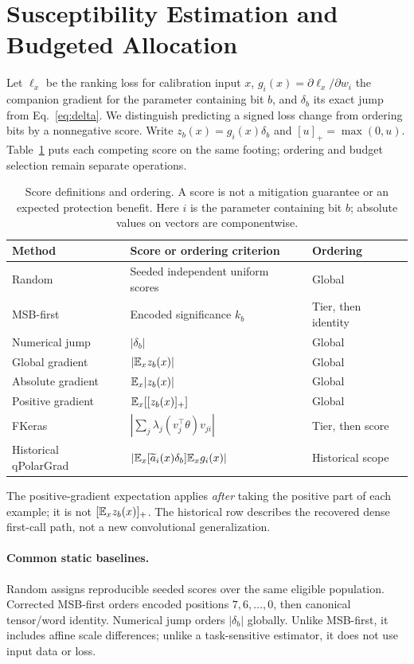 \section{Susceptibility Estimation and Budgeted Allocation}
\label{sec:estimators}
Let $\ell_x$ be the ranking loss for calibration input $x$, $g_i(x)=\partial\ell_x/\partial w_i$ the companion gradient for the parameter containing bit $b$, and $\delta_b$ its exact jump from Eq.~\eqref{eq:delta}. We distinguish predicting a signed loss change from ordering bits by a nonnegative score.
Write $z_b(x)=g_i(x)\delta_b$ and $[u]_+=\max(0,u)$.
Table~\ref{tab:definitions} puts each competing score on the same footing;
ordering and budget selection remain separate operations.
\begin{table}[t]\centering\small
\caption{Score definitions and ordering. A score is not a mitigation guarantee or an expected protection benefit. Here $i$ is the parameter containing bit $b$; absolute values on vectors are componentwise.}
\label{tab:definitions}
\begin{tabular}{lll}\toprule
Method & Score or ordering criterion & Ordering\\\midrule
Random & Seeded independent uniform scores & Global\\
MSB-first & Encoded significance $k_b$ & Tier, then identity\\
Numerical jump & $|\delta_b|$ & Global\\
Global gradient & $|\mathbb{E}_x z_b(x)|$ & Global\\
Absolute gradient & $\mathbb{E}_x|z_b(x)|$ & Global\\
Positive gradient & $\mathbb{E}_x\!\left[[z_b(x)]_+\right]$ & Global\\
FKeras~\cite{weng2024fkeras} & $|\sum_j\lambda_j(v_j^\top\theta)v_{ji}|$ & Tier, then score\\
Historical qPolarGrad & $|\mathbb{E}_x[\widetilde a_i(x)\delta_b]\mathbb{E}_x g_i(x)|$ & Historical scope\\
\bottomrule\end{tabular}
\end{table}
The positive-gradient expectation applies \emph{after} taking the positive part
of each example; it is not $[\mathbb{E}_x z_b(x)]_+$. The historical row describes the
recovered dense first-call path, not a new convolutional generalization.

\paragraph{Common static baselines.}
Random assigns reproducible seeded scores over the same eligible population. Corrected MSB-first orders encoded positions $7,6,\ldots,0$, then canonical tensor/word identity. Numerical jump orders $|\delta_b|$ globally. Unlike MSB-first, it includes affine scale differences; unlike a task-sensitive estimator, it does not use input data or loss.

